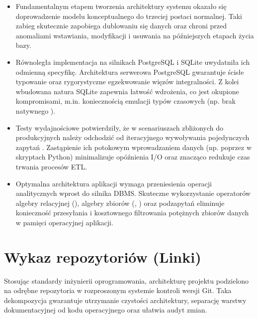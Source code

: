 \documentclass[a4paper,11pt,english,openany,oneside]{sphinxmanual}
\begin{document}
\begin{itemize}
\item {} 
\sphinxAtStartPar
{} Fundamentalnym etapem tworzenia architektury systemu okazało się doprowadzenie modelu konceptualnego do trzeciej postaci normalnej. Taki zabieg skutecznie zapobiega dublowaniu się danych oraz chroni przed anomaliami wstawiania, modyfikacji i usuwania na późniejszych etapach życia bazy.

\item {} 
\sphinxAtStartPar
{} Równoległa implementacja na silnikach PostgreSQL i SQLite uwydatniła ich odmienną specyfikę. Architektura serwerowa PostgreSQL gwarantuje ścisłe typowanie oraz rygorystyczne egzekwowanie więzów integralności. Z kolei wbudowana natura SQLite zapewnia łatwość wdrożenia, co jest okupione kompromisami, m.in. koniecznością emulacji typów czasowych (np. brak natywnego ).

\item {} 
\sphinxAtStartPar
{} Testy wydajnościowe potwierdziły, że w scenariuszach zbliżonych do produkcyjnych należy odchodzić od iteracyjnego wywoływania pojedynczych zapytań . Zastąpienie ich potokowym wprowadzaniem danych (np. poprzez  w skryptach Python) minimalizuje opóźnienia I/O oraz znacząco redukuje czas trwania procesów ETL.

\item {} 
\sphinxAtStartPar
{} Optymalna architektura aplikacji wymaga przeniesienia operacji analitycznych wprost do silnika DBMS. Skuteczne wykorzystanie operatorów algebry relacyjnej (), algebry zbiorów (, ) oraz podzapytań eliminuje konieczność przesyłania i kosztownego filtrowania potężnych zbiorów danych w pamięci operacyjnej aplikacji.

\end{itemize}


\section{Wykaz repozytoriów (Linki)}
\label{\detokenize{rozdzial_1/index:wykaz-repozytoriow-linki}}
\sphinxAtStartPar
Stosując standardy inżynierii oprogramowania, architekturę projektu podzielono na odrębne repozytoria w rozproszonym systemie kontroli wersji Git. Taka dekompozycja gwarantuje utrzymanie czystości architektury, separację warstwy dokumentacyjnej od kodu operacyjnego oraz ułatwia audyt zmian.
\end{document}
